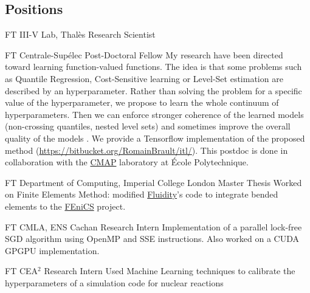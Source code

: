 \documentclass[10pt]{article} %
\begin{document}
\begin{paracol}{2}
\section{Positions}
%
%
%
%
%
{FT} %
{III-V Lab, Thal\`es} %
{Research Scientist} %
{}\par %
{FT} %
{Centrale-Sup\'elec} %
{Post-Doctoral Fellow} %
{My research have been directed toward learning function-valued functions. The
idea is that some problems such as Quantile Regression, Cost-Sensitive learning
or Level-Set estimation are described by an hyperparameter. Rather than solving
the problem for a specific value of the hyperparameter, we propose to learn the
whole continuum of hyperparameters. Then we can enforce stronger coherence of
the learned models (non-crossing quantiles, nested level sets) and sometimes
improve the overall quality of the models \citep{brault2018infinite}. We
provide a Tensorflow implementation of the proposed method
(\href{https://bitbucket.org/RomainBrault/itl/}{https://bitbucket.org/RomainBrault/itl/}).
This postdoc is done in collaboration with the
\href{https://portail.polytechnique.edu/cmap/fr}{CMAP} laboratory at \'Ecole
Polytechnique.
}\par \newpage %
{FT}
{Department of Computing, Imperial College London}
{Master Thesis}
{Worked on Finite Elements Method: modified
\href{http://fluidityproject.github.io/publications/}{Fluidity}'s code to
integrate bended elements to the \href{https://fenicsproject.org/}{FEniCS}
project.}\par
{}
{FT}
{CMLA, ENS Cachan}
{Research Intern}
{Implementation of a parallel lock-free SGD algorithm using OpenMP and SSE
instructions.  Also worked on a CUDA GPGPU implementation.}\par
{}
{FT}
{CEA${}^2$}
{Research Intern}
{Used Machine Learning techniques to calibrate the hyperparameters of a
simulation code for nuclear reactions
}
\end{paracol}
\end{document}
